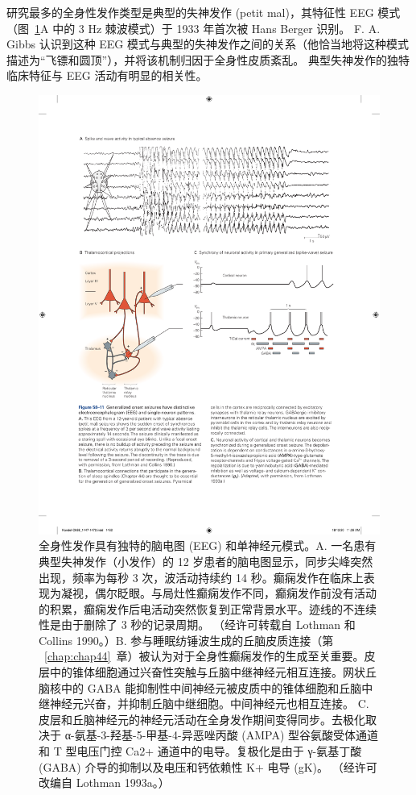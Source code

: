 研究最多的全身性发作类型是典型的失神发作 (petit mal)，其特征性 EEG 模式（图~\ref{fig:58_11}A 中的 3 Hz 棘波模式）于 1933 年首次被 Hans Berger 识别。
F. A. Gibbs 认识到这种 EEG 模式与典型的失神发作之间的关系（他恰当地将这种模式描述为“飞镖和圆顶”），并将该机制归因于全身性皮质紊乱。
典型失神发作的独特临床特征与 EEG 活动有明显的相关性。


\begin{figure}[htbp]
	\centering
	\includegraphics[width=0.9\linewidth]{chap58/fig_58_11}
	\caption{全身性发作具有独特的脑电图 (EEG) 和单神经元模式。A. 一名患有典型失神发作（小发作）的 12 岁患者的脑电图显示，同步尖峰突然出现，频率为每秒 3 次，波活动持续约 14 秒。癫痫发作在临床上表现为凝视，偶尔眨眼。与局灶性癫痫发作不同，癫痫发作前没有活动的积累，癫痫发作后电活动突然恢复到正常背景水平。迹线的不连续性是由于删除了 3 秒的记录周期。 （经许可转载自 Lothman 和 Collins 1990。）B. 参与睡眠纺锤波生成的丘脑皮质连接（第 ~\ref{chap:chap44}~章）被认为对于全身性癫痫发作的生成至关重要。皮层中的锥体细胞通过兴奋性突触与丘脑中继神经元相互连接。网状丘脑核中的 GABA 能抑制性中间神经元被皮质中的锥体细胞和丘脑中继神经元兴奋，并抑制丘脑中继细胞。中间神经元也相互连接。 C. 皮层和丘脑神经元的神经元活动在全身发作期间变得同步。去极化取决于 α-氨基-3-羟基-5-甲基-4-异恶唑丙酸 (AMPA) 型谷氨酸受体通道和 T 型电压门控 Ca2+ 通道中的电导。复极化是由于 γ-氨基丁酸 (GABA) 介导的抑制以及电压和钙依赖性 K+ 电导 (gK)。 （经许可改编自 Lothman 1993a。）}
	\label{fig:58_11}
\end{figure}


